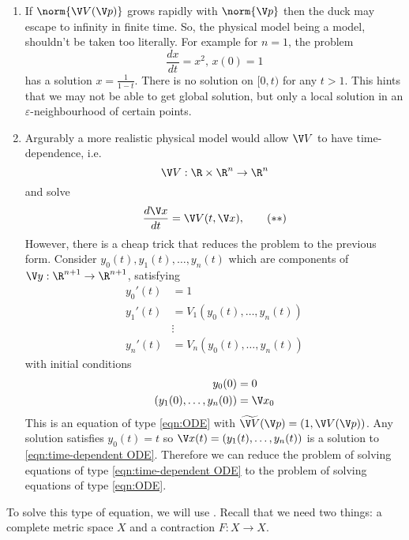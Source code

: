 \documentclass[a4paper]{article}
\theoremstyle{definition}
\begin{document}
\begin{remark}\leavevmode
  \begin{enumerate}
  \item If \(\norm{\V V(\V p)}\) grows rapidly with \(\norm{\V p}\) then the duck may escape to infinity in finite time. So, the physical model being a model, shouldn't be taken too literally. For example for \(n = 1\), the problem
    \[
      \frac{dx}{dt} = x^2, \, x(0) = 1
    \]
    has a solution \(x = \frac{1}{1 - t}\). There is no solution on \([0, t)\) for any \(t > 1\). This hints that we may not be able to get global solution, but only a local solution in an \(\varepsilon\)-neighbourhood of certain points.
  \item Argurably a more realistic physical model would allow \(\V V\) to have time-dependence, i.e.
    \[
      \V V: \R \times \R^n \to \R^n
    \]
    and solve
    \begin{equation*}
      \label{eqn:time-dependent ODE}
      \frac{d \V x}{dt} = \V V(t, \V x),
      \tag{\(\ast\ast\)}
    \end{equation*}
    However, there is a cheap trick that reduces the problem to the previous form. Consider \(y_0(t), y_1(t), \dots, y_n(t)\) which are components of \(\V y: \R^{n + 1} \to \R^{n + 1}\), satisfying
    \begin{align*}
      y_0'(t) &= 1 \\
      y_1'(t) &= V_1(y_0(t), \dots, y_n(t)) \\
              & \vdots \\
      y_n'(t) &= V_n(y_0(t), \dots, y_n(t))
    \end{align*}
    with initial conditions
    \begin{align*}
      y_0(0) &= 0 \\
      (y_1(0), \dots, y_n(0)) &= \V x_0
    \end{align*}
    This is an equation of type \eqref{eqn:ODE} with \(\widetilde{\V V}(\V p) = (1, \V V(\V p))\). Any solution satisfies \(y_0(t) = t\) so \(\V x(t) = (y_1(t), \dots, y_n(t))\) is a solution to \eqref{eqn:time-dependent ODE}.
    Therefore we can reduce the problem of solving equations of type \eqref{eqn:time-dependent ODE} to the problem of solving equations of type \eqref{eqn:ODE}.
  \end{enumerate}
\end{remark}

To solve this type of equation, we will use . Recall that we need two things: a complete metric space \(X\) and a contraction \(F: X \to X\).
\end{document}
